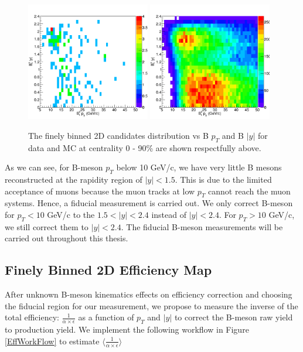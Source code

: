 \begin{figure}[h]
\begin{center}
\includegraphics[width= 0.48\textwidth]{Figures/Chapter4/hBptByData.png}
\includegraphics[width= 0.48\textwidth]{Figures/Chapter4/hBptByMC.png}
\caption{The finely binned 2D candidates distribution vs B $p_T$ and B $|y|$ for data and MC at centrality 0 - 90\% are shown respectfully above.}
\label{Bs2DRECO}
\end{center}
\end{figure}

As we can see, for B-meson $p_T$ below 10 GeV/c, we have very little B mesons reconstructed at the rapidity region of $|y| < 1.5$. This is due to the limited acceptance of muons because the muon tracks at low $p_T$ cannot reach the muon systems. Hence, a fiducial measurement is carried out. We only correct B-meson for $p_T < 10$ GeV/c to the $1.5 < |y| < 2.4$ instead of $|y| < 2.4$. For $p_T > 10$ GeV/c, we still correct them to $|y| < 2.4$. The fiducial B-meson measurements will be carried out throughout this thesis.

\subsection{Finely Binned 2D Efficiency Map}

After unknown B-meson kinematics effects on efficiency correction and choosing the fiducial region for our measurement, we propose to measure the inverse of the total efficiency: $\frac{1}{\alpha \times \epsilon}$ as a function of $p_T$ and $|y|$ to correct the B-meson raw yield to production yield. We implement the following workflow in Figure \ref{EffWorkFlow} to estimate $\langle \frac{1}{\alpha \times \epsilon} \rangle$


